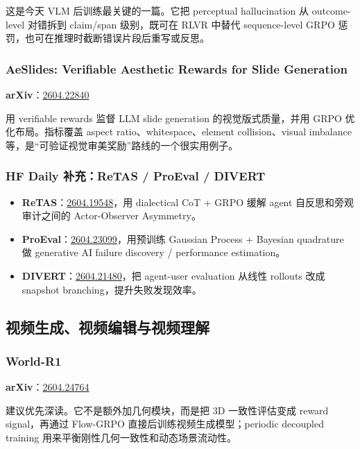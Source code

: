 这是今天 VLM 后训练最关键的一篇。它把 perceptual hallucination 从 outcome-level 对错拆到 claim/span 级别，既可在 RLVR 中替代 sequence-level GRPO 惩罚，也可在推理时截断错误片段后重写或反思。

\subsubsection{AeSlides: Verifiable Aesthetic Rewards for Slide Generation}

\textbf{arXiv}：\href{https://arxiv.org/abs/2604.22840}{2604.22840}

用 verifiable rewards 监督 LLM slide generation 的视觉版式质量，并用 GRPO 优化布局。指标覆盖 aspect ratio、whitespace、element collision、visual imbalance 等，是“可验证视觉审美奖励”路线的一个很实用例子。

\subsubsection{HF Daily 补充：ReTAS / ProEval / DIVERT}

\begin{itemize}[leftmargin=1.5em]
  \item \textbf{ReTAS}：\href{https://arxiv.org/abs/2604.19548}{2604.19548}，用 dialectical CoT + GRPO 缓解 agent 自反思和旁观审计之间的 Actor-Observer Asymmetry。
  \item \textbf{ProEval}：\href{https://arxiv.org/abs/2604.23099}{2604.23099}，用预训练 Gaussian Process + Bayesian quadrature 做 generative AI failure discovery / performance estimation。
  \item \textbf{DIVERT}：\href{https://arxiv.org/abs/2604.21480}{2604.21480}，把 agent-user evaluation 从线性 rollouts 改成 snapshot branching，提升失败发现效率。
\end{itemize}

\subsection{视频生成、视频编辑与视频理解}

\subsubsection{World-R1}

\textbf{arXiv}：\href{https://arxiv.org/abs/2604.24764}{2604.24764}

建议优先深读。它不是额外加几何模块，而是把 3D 一致性评估变成 reward signal，再通过 Flow-GRPO 直接后训练视频生成模型；periodic decoupled training 用来平衡刚性几何一致性和动态场景流动性。

